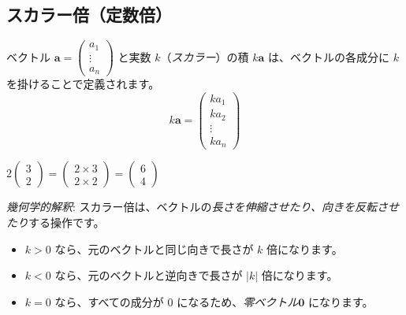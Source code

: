 \subsection{スカラー倍（定数倍）}
\begin{dfn}[ベクトルのスカラー倍]
ベクトル $\bm{a} = \begin{pmatrix} a_1 \\ \vdots \\ a_n \end{pmatrix}$ と実数 $k$（\emph{スカラー}）の積 $k\bm{a}$ は、ベクトルの各成分に $k$ を掛けることで定義されます。
\[k\bm{a} = \begin{pmatrix} k a_1 \\ k a_2 \\ \vdots \\ k a_n \end{pmatrix}\]
\end{dfn}
\begin{ex}
$2 \begin{pmatrix} 3 \\ 2 \end{pmatrix} = \begin{pmatrix} 2 \times 3 \\ 2 \times 2 \end{pmatrix} = \begin{pmatrix} 6 \\ 4 \end{pmatrix}$
\end{ex}

\emph{幾何学的解釈}: スカラー倍は、ベクトルの\emph{長さを伸縮させたり、向きを反転させたり}する操作です。
\begin{itemize}
\item $k > 0$ なら、元のベクトルと同じ向きで長さが $k$ 倍になります。
\item $k < 0$ なら、元のベクトルと逆向きで長さが $|k|$ 倍になります。
\item $k = 0$ なら、すべての成分が $0$ になるため、\emph{零ベクトル}$\bm{0}$ になります。
\end{itemize}

